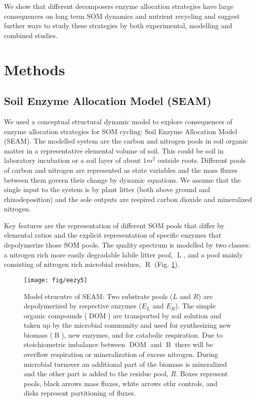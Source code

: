 We show that different decomposers enzyme allocation strategies have large
consequences on long term SOM dynamics and nutrient recycling and suggest
further ways to study these strategies by both experimental, modelling and
combined studies.

\section{Methods}
\subsection{Soil Enzyme Allocation Model (SEAM)}
We used a conceptual structural dynamic model to explore consequences of enzyme
allocation strategies for SOM cycling: Soil Enzyme Allocation Model (SEAM). The
modelled system are the carbon and nitrogen pools in soil organic matter in a
representative elemental volume of soil. This could be soil in laboratory
incubation or a soil layer of about $1 \unit{m}^2$ outside roots. Different
pools of carbon and nitrogen are represented as state variables and the mass
fluxes between them govern their change by dynamic equations. We assume that the
single input to the system is by plant litter (both above ground and
rhizodeposition) and the sole outputs are respired carbon dioxide and
mineralized nitrogen. 

Key features are the representation of different SOM pools that differ by
elemental ratios and the explicit representation of specific enzymes that
depolymerize those SOM pools. The quality spectrum is modelled by two
classes: a nitrogen rich more easily degradable labile litter pool,
$\operatorname{L}$, and a pool mainly consisting of nitrogen rich microbial
residues, $\operatorname{R}$ (Fig. \ref{fig:SEAM}).

\begin{figure}[t] \vspace*{2mm}
\label{fig:SEAM}
\begin{center}
\texttt{[image: fig/eezy5]}
\end{center}
\caption{Model strucutre of SEAM: Two substrate pools ($L$ and
$R$) are depolymerized by respective enzymes
($E_L$ and $E_R$). The simple organic
compounds ($\operatorname{DOM}$) are transported by soil solution and taken up
by the microbial community  and used for synthesizing
new biomass ($\operatorname{B}$), new enzymes, and for catabolic respiration. 
Due to stoichiometric imbalance between $\operatorname{DOM}$ and $\operatorname{B}$
there will be overflow respiration or mineralization of excess nitrogen. During
microbial turnover an additional part of the biomass is mineralized and the
other part is added to the residue pool, $R$. Boxes represent pools, black
arrows mass fluxes, white arrows othr controls, and disks represent
partitioning of fluxes.}
\end{figure}

